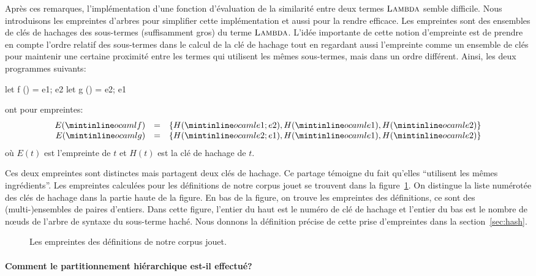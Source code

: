 Après ces remarques, l'implémentation d'une fonction d'évaluation de
la similarité entre deux termes $\textsc{Lambda}$ semble difficile. Nous
introduisons les empreintes d'arbres pour simplifier cette
implémentation et aussi pour la rendre efficace. Les empreintes sont
des ensembles de clés de hachages des sous-termes (suffisamment gros)
du terme $\textsc{Lambda}$. L'idée importante de cette notion d'empreinte
est de prendre en compte l'ordre relatif des sous-termes dans le
calcul de la clé de hachage tout en regardant aussi l'empreinte comme un ensemble
de clés pour maintenir une certaine proximité entre les termes qui
utilisent les mêmes sous-termes, mais dans un ordre différent. Ainsi,
les deux programmes suivants:
\begin{ocaml}
let f () = e1; e2
let g () = e2; e1
\end{ocaml}
\noindent ont pour empreintes:
\[
\begin{array}{rcl}
E(\iocaml{f}) &=& \{ H(\iocaml{e1; e2}), H(\iocaml{e1}), H(\iocaml{e2}) \} \\
E(\iocaml{g}) &=& \{ H(\iocaml{e2; e1}), H(\iocaml{e1}), H(\iocaml{e2}) \}
\end{array}
\]
\noindent où $E(t)$ est l'empreinte de $t$ et $H(t)$ est la clé de hachage de $t$.

Ces deux empreintes sont distinctes mais partagent deux clés de
hachage. Ce partage témoigne du fait qu'elles ``utilisent les mêmes
ingrédients''. Les empreintes calculées pour les définitions de notre
corpus jouet se trouvent dans la figure~\ref{fig:hash}. On distingue
la liste numérotée des clés de hachage dans la partie haute de la figure.
En bas de la figure, on trouve les empreintes des définitions, ce sont
des (multi-)ensembles de paires d'entiers. Dans cette figure, l'entier
du haut est le numéro de clé de hachage et l'entier du  bas est le
nombre de n{\oe}uds de l'arbre de syntaxe du sous-terme haché.
%
Nous donnons la définition précise de cette prise d'empreintes dans la
section~\ref{sec:hash}.

\begin{figure}
{\tiny}
\caption{Les empreintes des définitions de notre corpus jouet.}
\label{fig:hash}
\end{figure}

\paragraph{Comment le partitionnement hiérarchique est-il effectué?}

